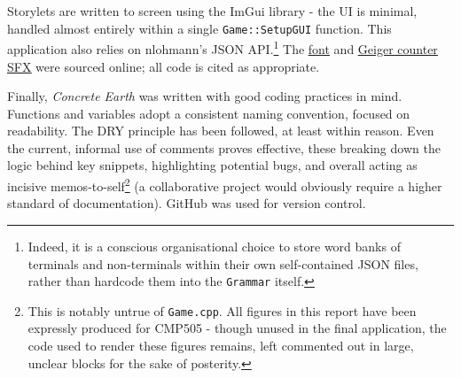 \documentclass[a4paper, 11pt]{article}
\begin{document}
\begin{flushleft}
\vspace{5pt}\noindent
Storylets are written to screen using the ImGui library - the UI is minimal, handled almost entirely within a single \texttt{Game::SetupGUI} function. This application also relies on nlohmann's JSON API.\footnote{Indeed, it is a conscious organisational choice to store word banks of terminals and non-terminals within their own self-contained JSON files, rather than hardcode them into the \texttt{Grammar} itself.} The \href{https://www.dafont.com/benegraphic.font}{\ul{font}} and \href{https://freesound.org/people/JustLaz/sounds/616516/}{\ul{Geiger counter SFX}} were sourced online; all code is cited as appropriate.

\vspace{5pt}\noindent
Finally, \textit{Concrete Earth} was written with good coding practices in mind. Functions and variables adopt a consistent naming convention, focused on readability. The DRY principle has been followed, at least within reason. Even the current, informal use of comments proves effective, these breaking down the logic behind key snippets, highlighting potential bugs, and overall acting as incisive memos-to-self\footnote{This is notably untrue of \texttt{Game.cpp}. All figures in this report have been expressly produced for CMP505 - though unused in the final application, the code used to render these figures remains, left commented out in large, unclear blocks for the sake of posterity.} (a collaborative project would obviously require a higher standard of documentation). GitHub was used for version control.


\end{flushleft}
\end{document}
